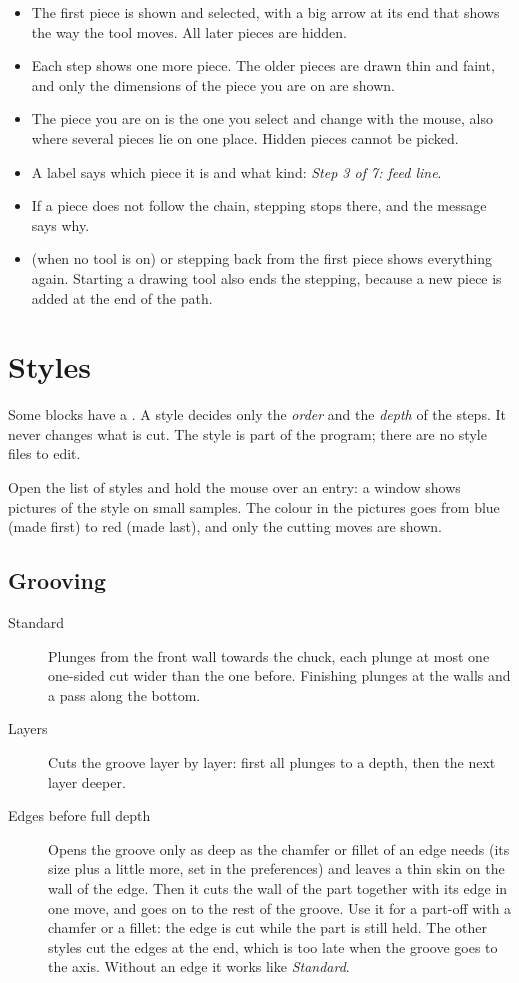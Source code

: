 \begin{itemize}
\item The first piece is shown and selected, with a big arrow at its end that shows the way the tool moves. All later pieces are hidden.
\item Each step shows one more piece. The older pieces are drawn thin and faint, and only the dimensions of the piece you are on are shown.
\item The piece you are on is the one you select and change with the mouse, also where several pieces lie on one place. Hidden pieces cannot be picked.
\item A label says which piece it is and what kind: \emph{Step 3 of 7: feed line}.
\item If a piece does not follow the chain, stepping stops there, and the message says why.
\item {} (when no tool is on) or stepping back from the first piece shows everything again. Starting a drawing tool also ends the stepping, because a new piece is added at the end of the path.
\end{itemize}

\section{Styles}\label{sec:blocks:styles}

Some blocks have a . A style decides only the \emph{order} and the \emph{depth} of the steps. It never changes what is cut. The style is part of the program; there are no style files to edit.

Open the list of styles and hold the mouse over an entry: a window shows pictures of the style on small samples. The colour in the pictures goes from blue (made first) to red (made last), and only the cutting moves are shown.

\subsection{Grooving}
\begin{description}
\item[Standard] Plunges from the front wall towards the chuck, each plunge at most one one-sided cut wider than the one before. Finishing plunges at the walls and a pass along the bottom.
\item[Layers] Cuts the groove layer by layer: first all plunges to a depth, then the next layer deeper.
\item[Edges before full depth] Opens the groove only as deep as the chamfer or fillet of an edge needs (its size plus a little more, set in the preferences) and leaves a thin skin on the wall of the edge. Then it cuts the wall of the part together with its edge in one move, and goes on to the rest of the groove. Use it for a part-off with a chamfer or a fillet: the edge is cut while the part is still held. The other styles cut the edges at the end, which is too late when the groove goes to the axis. Without an edge it works like \emph{Standard}.
\end{description}

